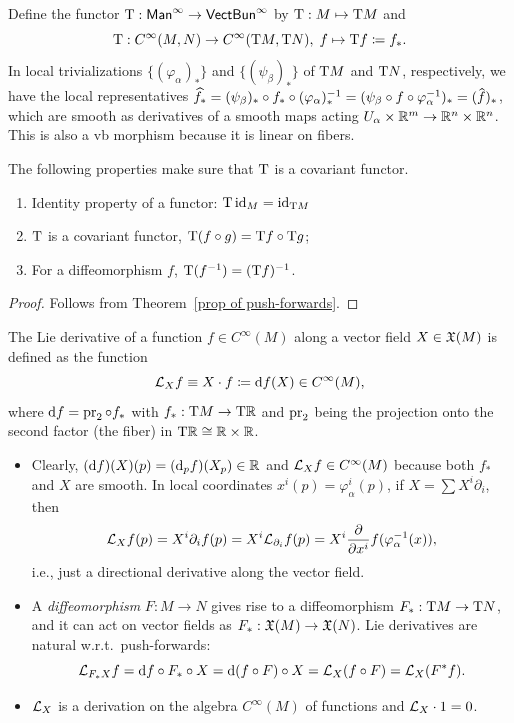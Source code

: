 \begin{defn}
    Define the functor $\mathrm{T}:\mathsf{Man}^\infty \to \mathsf{VectBun}^\infty$ by $\mathrm{T}:M\mapsto \mathrm{T} M$ and \[\mathrm{T}:C^\infty(M,N)\to C^\infty(\mathrm{T} M,\mathrm{T} N),\; f\mapsto \mathrm{T} f\coloneqq f_\ast.\]
    In local trivializations $\{(\varphi_\alpha)_\ast\}$ and $\{(\psi_\beta)_\ast\}$ of $\mathrm{T} M$ and $\mathrm{T} N$, respectively, we have the local representatives $\widehat{ f_\ast}=(\psi_\beta)_\ast\circ f_\ast \circ (\varphi_\alpha)_\ast^{-1}=(\psi_\beta\circ f\circ\varphi_\alpha^{-1})_\ast=(\wh{f})_\ast$, which are smooth as derivatives of a smooth maps acting $U_\alpha\times \mathbb{R}^m\to \mathbb{R}^{n}\times\mathbb{R}^n$. This is also a \gls{vb} morphism because it is linear on fibers.
\end{defn}

\begin{prop}
    The following properties make sure that $\mathrm{T}$ is a covariant functor.
\begin{enumerate}
    \item Identity property of a functor: $\mathrm{T}\operatorname{id}_M=\operatorname{id}_{\mathrm{T} M}$
    \item $\mathrm{T}$ is a covariant functor, $\mathrm{T}(f\circ g)=\mathrm{T} f\circ \mathrm{T} g$;
    \item For a diffeomorphism $f$, $\mathrm{T}(f^{-1})=(\mathrm{T} f)^{-1}$.
\end{enumerate}
\end{prop}
\begin{proof}
    Follows from Theorem~\ref{prop of push-forwards}.
\end{proof}


\begin{defn}
    The Lie derivative of a function $f\in C^\infty(M)$ along a vector field $X\in\mathfrak{X}(M)$ is defined as the function \[\mathcal{L}_X f\equiv X\cdot f\coloneqq {\mathrm{d}} f (X)\in C^\infty(M),\] where ${\mathrm{d}} f=\operatorname{pr}_2\circ f_\ast$ with $f_\ast:\mathrm{T} M\to \mathrm{T}\mathbb{R} $ and $\operatorname{pr}_2$ being the projection onto the second factor (the fiber) in $\mathrm{T}\mathbb{R} \cong \mathbb{R} \times\mathbb{R} $. \label{def of Lie derivative}
\end{defn}

\begin{itemize}
    \item Clearly, $({\mathrm{d}} f)(X)(p)=({\mathrm{d}}_p f)(X_p)\in \mathbb{R} $ and $\mathcal{L}_X f\in C^\infty (M)$ because both $f_\ast$ and $X$ are smooth. In local coordinates $x^i(p)=\varphi_\alpha^i(p)$, if $X=\sum X^i \partial_i$, then 
    \[\mathcal{L}_X f(p)=X^i\partial_i f(p)=X^i\mathcal{L}_{\partial_i}f(p)=X^i \frac{\partial}{\partial x^i}f(\varphi_\alpha^{-1}(x)),\]
    i.e., just a directional derivative along the vector field.
    \item A \emph{diffeomorphism} $F:M\to N$ gives rise to a diffeomorphism $F_\ast:\mathrm{T} M\to \mathrm{T} N$, and it can act on vector fields as $F_\ast :\mathfrak{X}(M)\to \mathfrak{X}(N)$. Lie derivatives are natural w.r.t.\ push-forwards: 
    \[
    \mathcal{L}_{F_\ast X}f={\mathrm{d}} f\circ F_\ast\circ X={\mathrm{d}} (f\circ F)\circ X=\mathcal{L}_X (f\circ F)=\mathcal{L}_X (F^\ast f).
    \]
    \item $\mathcal{L}_X$ is a derivation on the algebra $C^\infty(M)$ of functions and $\mathcal{L}_X\cdot 1=0$.
\end{itemize}


